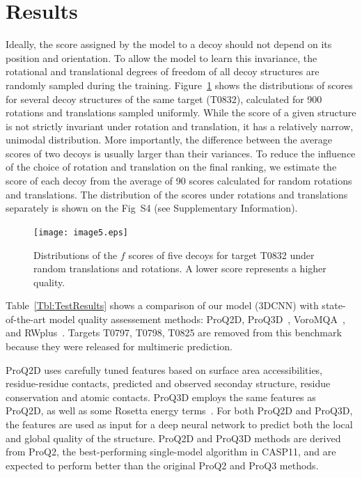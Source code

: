 \documentclass{bioinfo}
\begin{document}
\section{Results}
Ideally, the score assigned by the model to a decoy should not depend
on its position and orientation.  To allow the model to learn this
invariance, the rotational and translational degrees of freedom of all
decoy structures are randomly sampled during the training.
Figure~\ref{Fig:DecoysScoreDistribution} shows the distributions of
scores for several decoy structures of the same target (T0832),
calculated for 900 rotations and translations sampled uniformly.
While the score of a given structure is not strictly invariant under
rotation and translation, it has a relatively narrow, unimodal
distribution.  More importantly, the difference between the average
scores of two decoys is usually larger than their variances. To reduce
the influence of the choice of rotation and translation on the final
ranking, we estimate the score of each decoy from the average of 90
scores calculated for random rotations and translations. The distribution 
of the scores under rotations and translations separately is shown on 
the Fig~S4 (see Supplementary Information).

\begin{figure}[!tpb]
    \centering
    \texttt{[image: image5.eps]}
    \caption{Distributions of the $f$ scores of five decoys for target
    T0832 under random translations and rotations. A lower score
    represents a higher quality.}
    \label{Fig:DecoysScoreDistribution}
\end{figure}

Table~\ref{Tbl:TestResults} shows a comparison of our model (3DCNN)
with state-of-the-art model quality assessement methods: ProQ2D,
ProQ3D~\citep{uziela2017proq3d}, VoroMQA~\citep{olechnovivc2017voromqa},
and RWplus~\citep{zhang2010novel}.
Targets T0797, T0798, T0825 are removed from this benchmark because
they were released for multimeric prediction.

ProQ2D uses carefully tuned features based on surface area
accessibilities, residue-residue contacts, predicted and observed
seconday structure, residue conservation and atomic contacts. ProQ3D
employs the same features as ProQ2D, as well as some Rosetta energy
terms~\citep{leaverfay2011rosetta}. For both ProQ2D and ProQ3D, the
features are used as input for a deep neural network to predict both
the local and global quality of the structure.
ProQ2D and ProQ3D methods are derived from ProQ2, the best-performing
single-model algorithm in CASP11, and are expected to perform better
than the original ProQ2 and ProQ3 methods.
\end{document}
